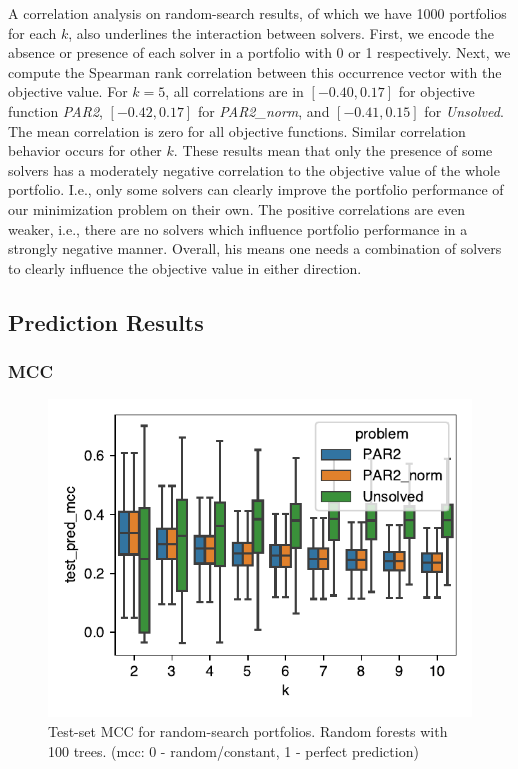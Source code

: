 \documentclass[conference]{IEEEtran}
\begin{document}
A correlation analysis on random-search results, of which we have 1000 portfolios for each $k$, also underlines the interaction between solvers.
First, we encode the absence or presence of each solver in a portfolio with 0 or 1 respectively.
Next, we compute the Spearman rank correlation between this occurrence vector with the objective value.
For $k=5$, all correlations are in $[-0.40,0.17]$ for objective function \emph{PAR2}, $[-0.42,0.17]$ for \emph{PAR2\_norm}, and $[-0.41,0.15]$ for \emph{Unsolved}.
The mean correlation is zero for all objective functions.
Similar correlation behavior occurs for other $k$.
These results mean that only the presence of some solvers has a moderately negative correlation to the objective value of the whole portfolio.
I.e., only some solvers can clearly improve the portfolio performance of our minimization problem on their own.
The positive correlations are even weaker, i.e., there are no solvers which influence portfolio performance in a strongly negative manner.
Overall, his means one needs a combination of solvers to clearly influence the objective value in either direction.

\subsection{Prediction Results}

\subsubsection{MCC}

\begin{figure}[t]
	\centering
	\includegraphics[width=\columnwidth]{plots/prediction-test-mcc.pdf}
	\caption{Test-set MCC for random-search portfolios. Random forests with 100 trees. (mcc: 0 - random/constant, 1 - perfect prediction)}
	\label{fig:prediction-test-mcc}
\end{figure}
\end{document}
